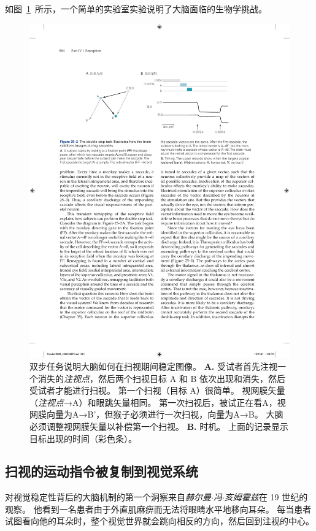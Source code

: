 如图~\ref{fig:25_2}~所示，一个简单的实验室实验说明了大脑面临的生物学挑战。


\begin{figure}[htbp]
	\centering
	\includegraphics[width=0.9\linewidth]{chap25/fig_25_2}
	\caption{双步任务说明大脑如何在扫视期间稳定图像。
		\textbf{A.} 受试者首先注视一个消失的\textit{注视点}，然后两个扫视目标 A 和 B 依次出现和消失，然后受试者才能进行扫视。
		第一个扫视（目标 A）很简单。
		视网膜矢量（\textit{注视点}→A）和眼跳矢量相同。
		第一次扫视后，被试正在看A，视网膜向量为A→B'，但猴子必须进行一次扫视，向量为A→B。
		大脑必须调整视网膜矢量以补偿第一个扫视。
		\textbf{B.} 时机。 上面的记录显示目标出现的时间（彩色条）。}
	\label{fig:25_2}
\end{figure}



\subsection{扫视的运动指令被复制到视觉系统}

对视觉稳定性背后的大脑机制的第一个洞察来自\textit{赫尔曼$\cdot$冯$\cdot$亥姆霍兹}在 19 世纪的观察。
他看到一名患者由于外直肌麻痹而无法将眼睛水平地移向耳朵。
每当患者试图看向他的耳朵时，整个视觉世界就会跳向相反的方向，然后回到注视的中心。


